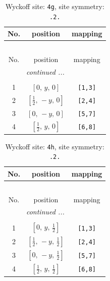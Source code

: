 \documentclass[fleqn,8pt]{jsarticle}
\begin{document}
\begin{longtable}{ccc}
\caption{Wyckoff site: {\tt 4g}, site symmetry: {\tt .2.}}
 \\
 \hline \hline
No. & position & mapping \\ \hline \endfirsthead

\multicolumn{2}{l}{\tablename\ \thetable{}} \\
 \hline \hline
No. & position & mapping \\ \hline \endhead

 \hline \hline
\multicolumn{2}{r}{\footnotesize\it continued ...} \\ \endfoot

 \hline \hline
\multicolumn{2}{r}{} \\ \endlastfoot

1 & $\left[ 0,\, y,\, 0 \right]$ & {\tt [1,3]} \\ \hline
2 & $\left[ \frac{1}{2},\, - y,\, 0 \right]$ & {\tt [2,4]} \\ \hline
3 & $\left[ 0,\, - y,\, 0 \right]$ & {\tt [5,7]} \\ \hline
4 & $\left[ \frac{1}{2},\, y,\, 0 \right]$ & {\tt [6,8]} \\
\end{longtable}
\renewcommand{\arraystretch}{1.2}
\begin{longtable}{ccc}
\caption{Wyckoff site: {\tt 4h}, site symmetry: {\tt .2.}}
 \\
 \hline \hline
No. & position & mapping \\ \hline \endfirsthead

\multicolumn{2}{l}{\tablename\ \thetable{}} \\
 \hline \hline
No. & position & mapping \\ \hline \endhead

 \hline \hline
\multicolumn{2}{r}{\footnotesize\it continued ...} \\ \endfoot

 \hline \hline
\multicolumn{2}{r}{} \\ \endlastfoot

1 & $\left[ 0,\, y,\, \frac{1}{2} \right]$ & {\tt [1,3]} \\ \hline
2 & $\left[ \frac{1}{2},\, - y,\, \frac{1}{2} \right]$ & {\tt [2,4]} \\ \hline
3 & $\left[ 0,\, - y,\, \frac{1}{2} \right]$ & {\tt [5,7]} \\ \hline
4 & $\left[ \frac{1}{2},\, y,\, \frac{1}{2} \right]$ & {\tt [6,8]} \\
\end{longtable}
\end{document}
